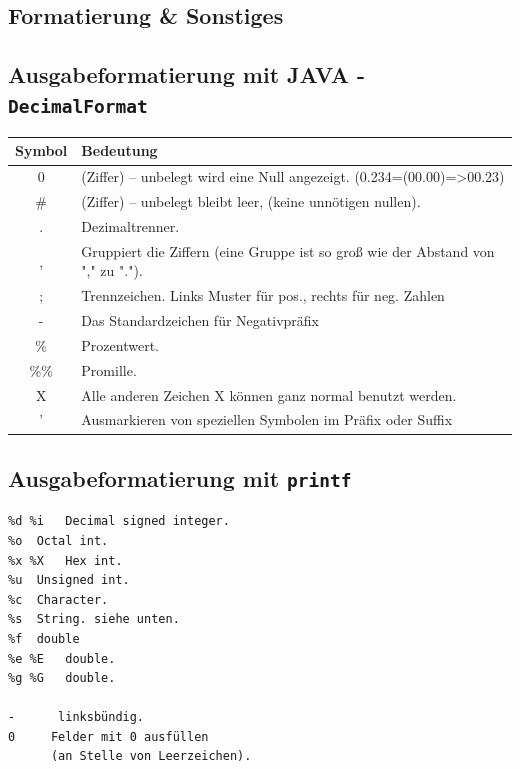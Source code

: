 \documentclass[10pt,a4paper,ngerman,oneside,]{article}
\begin{document}
\begin{multicols}{2}
\section{Formatierung \& Sonstiges}
\subsection{Ausgabeformatierung mit JAVA - \texttt{DecimalFormat}}
\begin{tabular}{cl}
Symbol & Bedeutung\\\hline
0 &	(Ziffer) – unbelegt wird eine Null angezeigt. (0.234=(00.00)=>00.23)\\
\# &	(Ziffer) – unbelegt bleibt leer, (keine unnötigen nullen).\\
. &	Dezimaltrenner. \\
, &	Gruppiert die Ziffern (eine Gruppe ist so groß wie der Abstand von "," zu ".").\\
; &	Trennzeichen. Links Muster für pos., rechts für neg. Zahlen\\
- &	Das Standardzeichen für Negativpräfix\\
\% &	Prozentwert.\\
\%\% &	Promille.\\
X &	Alle anderen Zeichen X können ganz normal benutzt werden.\\
' &	Ausmarkieren von speziellen Symbolen im Präfix oder Suffix \\
\end{tabular}
\subsection{Ausgabeformatierung mit \texttt{printf}}
\begin{verbatim}
%d %i	Decimal signed integer.
%o	Octal int.
%x %X	Hex int.
%u	Unsigned int.
%c	Character.
%s	String.	siehe unten.
%f	double
%e %E	double.
%g %G	double.

-      linksbündig.
0  	  Felder mit 0 ausfüllen 
      (an Stelle von Leerzeichen).
\end{verbatim}
\begin{verbatim}


\end{verbatim}
\end{multicols}
\end{document}
